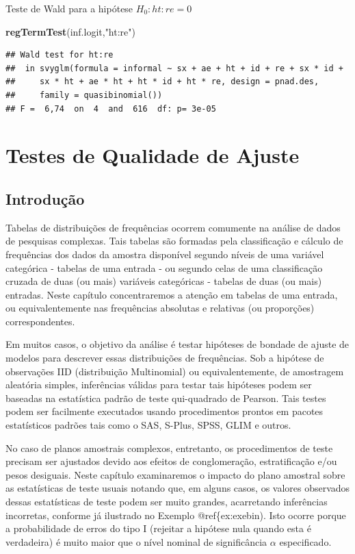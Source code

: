 \documentclass[]{book}
\newenvironment{Shaded}{\begin{snugshade}}{\end{snugshade}}
\newcommand{\KeywordTok}[1]{\textcolor[rgb]{0.13,0.29,0.53}{\textbf{#1}}}
\newcommand{\StringTok}[1]{\textcolor[rgb]{0.31,0.60,0.02}{#1}}
\newcommand{\NormalTok}[1]{#1}
\theoremstyle{definition}
\theoremstyle{definition}
\theoremstyle{definition}
\theoremstyle{remark}
\begin{document}
Teste de Wald para a hipótese \(H_0: ht:re=0\)

\begin{Shaded}
\begin{Highlighting}[]
\KeywordTok{regTermTest}\NormalTok{(inf.logit,}\StringTok{"ht:re"}\NormalTok{)}
\end{Highlighting}
\end{Shaded}

\begin{verbatim}
## Wald test for ht:re
##  in svyglm(formula = informal ~ sx + ae + ht + id + re + sx * id + 
##     sx * ht + ae * ht + ht * id + ht * re, design = pnad.des, 
##     family = quasibinomial())
## F =  6,74  on  4  and  616  df: p= 3e-05
\end{verbatim}

\chapter{Testes de Qualidade de Ajuste}\label{testqualajust}

\section{Introdução}\label{introducao-1}

Tabelas de distribuições de frequências ocorrem comumente na análise de
dados de pesquisas complexas. Tais tabelas são formadas pela
classificação e cálculo de frequências dos dados da amostra disponível
segundo níveis de uma variável categórica - tabelas de uma entrada - ou
segundo celas de uma classificação cruzada de duas (ou mais) variáveis
categóricas - tabelas de duas (ou mais) entradas. Neste capítulo
concentraremos a atenção em tabelas de uma entrada, ou equivalentemente
nas frequências absolutas e relativas (ou proporções) correspondentes.

Em muitos casos, o objetivo da análise é testar hipóteses de bondade de
ajuste de modelos para descrever essas distribuições de frequências. Sob
a hipótese de observações IID (distribuição Multinomial) ou
equivalentemente, de amostragem aleatória simples, inferências válidas
para testar tais hipóteses podem ser baseadas na estatística padrão de
teste qui-quadrado de Pearson. Tais testes podem ser facilmente
executados usando procedimentos prontos em pacotes estatísticos padrões
tais como o SAS, S-Plus, SPSS, GLIM e outros.

No caso de planos amostrais complexos, entretanto, os procedimentos de
teste precisam ser ajustados devido aos efeitos de conglomeração,
estratificação e/ou pesos desiguais. Neste capítulo examinaremos o
impacto do plano amostral sobre as estatísticas de teste usuais notando
que, em alguns casos, os valores observados dessas estatísticas de teste
podem ser muito grandes, acarretando inferências incorretas, conforme já
ilustrado no Exemplo @ref\{ex:exebin). Isto ocorre porque a
probabilidade de erros do tipo I (rejeitar a hipótese nula quando esta é
verdadeira) é muito maior que o nível nominal de significância
\(\alpha\) especificado.
\end{document}

